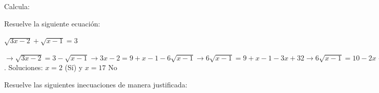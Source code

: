 \documentclass[addpoints,spanish, 12pt,a4paper]{exam}
\begin{document}
\begin{questions}

\question Calcula: 

\question[1] Resuelve la siguiente ecuación: 

$\sqrt{3x-2}+\sqrt{x-1}=3$
\begin{solution}$\to\sqrt{3x-2}=3-\sqrt{x-1}\to 3x-2=9+x-1-6\sqrt{x-1}\to6\sqrt{x-1}=9+x-1-3x+32\to6\sqrt{x-1}=10-2x\to3\sqrt{x-1}=5-x\to x-1=25+x^2-10x\to x^2-19x+34=0$. Soluciones: $x=2$ (Sí) y $x=17$ No  \end{solution}



\question Resuelve las siguientes inecuaciones de manera justificada:
\begin{parts}

\part[1]$ x < x^3  $
\begin{solution} $\left(-1, 0\right) \cup \left(1, \infty\right)$ \end{solution}



\part[1]$\dfrac{x - 1}{x^{2} + x}\geqslant 0$  
\begin{solution} $\left(-1, 0\right) \cup \left[1, \infty\right)$ \end{solution}



\end{parts}
\end{questions}
\end{document}
